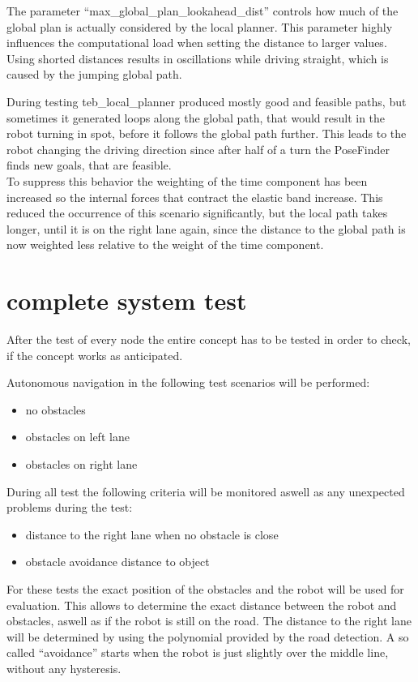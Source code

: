 The parameter ``max\_global\_plan\_lookahead\_dist'' controls how much of the global plan is actually considered by the local planner. This parameter highly influences the computational load when setting the distance to larger values. Using shorted distances results in oscillations while driving straight, which is caused by the jumping global path.

During testing teb\_local\_planner produced mostly good and feasible paths, but sometimes it generated loops along the global path, that would result in the robot turning in spot, before it follows the global path further. This leads to the robot changing the driving direction since after half of a turn the PoseFinder finds new goals, that are feasible.\\

To suppress this behavior the weighting of the time component has been increased so the internal forces that contract the elastic band increase. This reduced the occurrence of this scenario significantly, but the local path takes longer, until it is on the right lane again, since the distance to the global path is now weighted less relative to the weight of the time component.


\section{complete system test}

After the test of every node the entire concept has to be tested in order to check, if the concept works as anticipated.

Autonomous navigation in the following test scenarios will be performed:

\begin{itemize}
	\item no obstacles
	\item obstacles on left lane
	\item obstacles on right lane
\end{itemize}

During all test the following criteria will be monitored aswell as any unexpected problems during the test:

\begin{itemize}
	\item distance to the right lane when no obstacle is close
	\item obstacle avoidance distance to object
\end{itemize}

For these tests the exact position of the obstacles and the robot will be used for evaluation. This allows to determine the exact distance between the robot and obstacles, aswell as if the robot is still on the road. The distance to the right lane will be determined by using the polynomial provided by the road detection. A so called ``avoidance'' starts when the robot is just slightly over the middle line, without any hysteresis.

